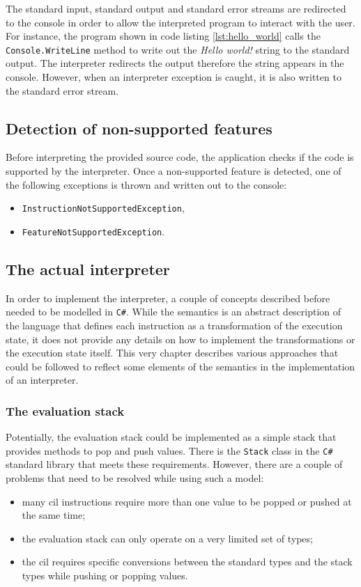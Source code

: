 \documentclass{article}
\numberwithin{equation}{section}
\begin{document}
The standard input, standard output and standard error streams are redirected to the console in order to allow the interpreted program to interact with the user. For instance, the program shown in code listing \ref{lst:hello_world} calls the \texttt{Console.WriteLine} method to write out the \textit{Hello world!} string to the standard output. The interpreter redirects the output therefore the string appears in the console. However, when an interpreter exception is caught, it is also written to the standard error stream.

\subsection{Detection of non-supported features}

Before interpreting the provided source code, the application checks if the code is supported by the interpreter. Once a non-supported feature is detected, one of the following exceptions is thrown and written out to the console:
\begin{itemize}
	\item{\texttt{InstructionNotSupportedException},}
	\item{\texttt{FeatureNotSupportedException}.}
\end{itemize}

\subsection{The actual interpreter}

In order to implement the interpreter, a couple of concepts described before needed to be modelled in \texttt{C\#}. While the semantics is an abstract description of the language that defines each instruction as a transformation of the execution state, it does not provide any details on how to implement the transformations or the execution state itself. This very chapter describes various approaches that could be followed to reflect some elements of the semantics in the implementation of an interpreter.

\subsubsection{The evaluation stack}

Potentially, the evaluation stack could be implemented as a simple stack that provides methods to pop and push values. There is the \texttt{Stack} class in the \texttt{C\#} standard library that meets these requirements. However, there are a couple of problems that need to be resolved while using such a model:
\begin{itemize}
	\item{many \acrshort{cil} instructions require more than one value to be popped or pushed at the same time;}
	\item{the evaluation stack can only operate on a very limited set of types;}
	\item{the \acrshort{cil} requires specific conversions between the standard types and the stack types while pushing or popping values.}
\end{itemize}
\end{document}
